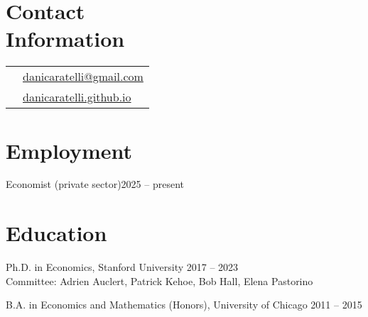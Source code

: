 \documentclass[margin,line]{res}                          %
\newenvironment{list1}{
	\begin{list}{\ding{113}}{%
			\setlength{\itemsep}{0in}
			\setlength{\parsep}{0in} \setlength{\parskip}{0in}
			\setlength{\topsep}{0in} \setlength{\partopsep}{0in}
			\setlength{\leftmargin}{0.17in}}}{\end{list}}
\begin{document}
	
	\begin{resume}
		\thispagestyle{plain} %
		
		\section{\sc Contact \\Information}
		\vspace{.05in}
		\begin{tabular}{@{}p{0.20in}p{2.75in}}
			&\href{mailto:danicaratelli@gmail.com}{danicaratelli@gmail.com}
			\\    
			& \href{https://danicaratelli.github.io/}{danicaratelli.github.io}
		\end{tabular}
		
		\section{\sc Employment}
		\begin{list1}
			\item[] Economist (private sector)\hfill 2025 -- present
		\end{list1}	
		
		\section{\sc Education}
		\begin{list1}
			\item[] Ph.D. in Economics, Stanford University \hfill 2017 -- 2023\\
			Committee: Adrien Auclert, Patrick Kehoe, Bob Hall, Elena Pastorino\smallskip
			\item[] B.A. in Economics and Mathematics (Honors), University of Chicago \hfill 2011 -- 2015
		\end{list1}
		

\end{resume}
\end{document}
